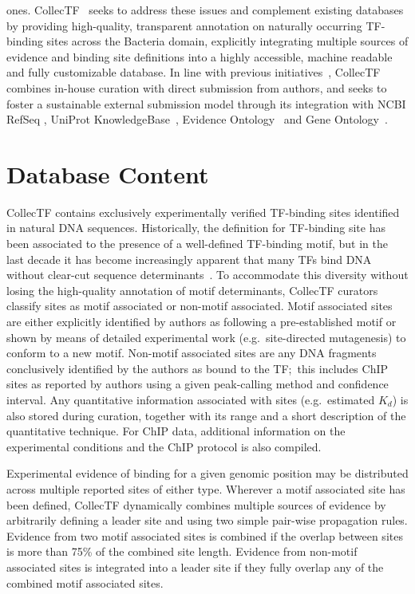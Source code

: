 ones. CollecTF~\citep{kilic2013collectf} seeks to address these issues and
complement existing databases by providing high-quality, transparent annotation
on naturally occurring TF-binding sites across the Bacteria domain, explicitly
integrating multiple sources of evidence and binding site definitions into a
highly accessible, machine readable and fully customizable database. In line
with previous initiatives~\citep{griffith2008oreganno}, CollecTF combines
in-house curation with direct submission from authors, and seeks to foster a
sustainable external submission model through its integration with NCBI RefSeq
\citep{pruitt2007ncbi}, UniProt KnowledgeBase~\citep{uniprot2014uniprot},
Evidence Ontology~\citep{chibucos2014standardized} and Gene
Ontology~\citep{gene2004gene}.

\section{Database Content}

CollecTF contains exclusively experimentally verified TF-binding sites
identified in natural DNA sequences. Historically, the definition for
TF-binding site has been associated to the presence of a well-defined
TF-binding motif, but in the last decade it has become increasingly apparent
that many TFs bind DNA without clear-cut sequence
determinants~\citep{hijum2009mechanisms, paul2007integration,
  barnard2004regulation}. To accommodate this diversity without losing the
high-quality annotation of motif determinants, CollecTF curators classify sites
as motif associated or non-motif associated. Motif associated sites are either
explicitly identified by authors as following a pre-established motif or shown
by means of detailed experimental work (e.g.\ site-directed mutagenesis) to
conform to a new motif. Non-motif associated sites are any DNA fragments
conclusively identified by the authors as bound to the TF;\ this includes ChIP
sites as reported by authors using a given peak-calling method and confidence
interval. Any quantitative information associated with sites (e.g.\ estimated
$K_d$) is also stored during curation, together with its range and a short
description of the quantitative technique. For ChIP data, additional
information on the experimental conditions and the ChIP protocol is also
compiled.

Experimental evidence of binding for a given genomic position may be
distributed across multiple reported sites of either type. Wherever a motif
associated site has been defined, CollecTF dynamically combines multiple
sources of evidence by arbitrarily defining a leader site and using two simple
pair-wise propagation rules. Evidence from two motif associated sites is
combined if the overlap between sites is more than 75\% of the combined site
length. Evidence from non-motif associated sites is integrated into a leader
site if they fully overlap any of the combined motif associated sites.

